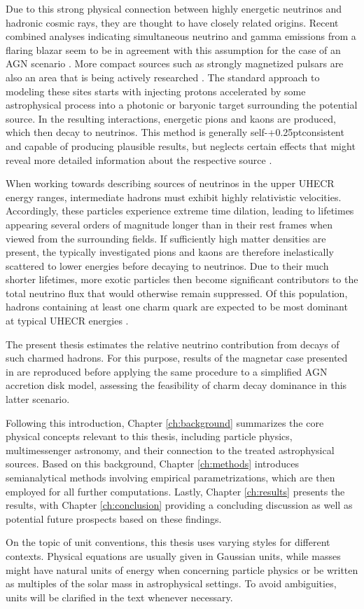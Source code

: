 Due to this strong physical connection between highly energetic neutrinos and hadronic cosmic rays, they are thought to have
closely related origins. Recent combined analyses indicating simultaneous neutrino and gamma emissions from a
flaring blazar seem to be in agreement with this assumption for the case of an AGN scenario \cite{ic_blazar_flare, ic_blazar_signal}.
More compact sources such as strongly magnetized pulsars are also an area that is being actively researched \cite{Murase_2009}.
The standard approach to modeling these sites starts with injecting protons accelerated by some astrophysical process into
a photonic or baryonic target surrounding the potential source. In the resulting interactions, energetic pions and kaons are
produced, which then decay to neutrinos. This method is generally self-{\kern+0.25pt}consistent and capable of producing
plausible results, but neglects certain effects that might reveal more detailed information about the respective source
\cite{Carpio_2020}.

When working towards describing sources of neutrinos in the upper UHECR energy ranges, intermediate hadrons must exhibit
highly relativistic velocities. Accordingly, these particles experience extreme time dilation, leading to lifetimes
appearing several orders of magnitude longer than in their rest frames when viewed from the surrounding fields.
If sufficiently high matter densities are present, the typically investigated pions and kaons are therefore inelastically
scattered to lower energies before decaying to neutrinos. Due to their much shorter lifetimes, more exotic particles then
become significant contributors to the total neutrino flux that would otherwise remain suppressed. Of this population,
hadrons containing at least one charm quark are expected to be most dominant at typical UHECR energies \cite{Tjus_2023}.

The present thesis estimates the relative neutrino contribution from decays of such charmed hadrons. For this purpose, results
of the magnetar case presented in \cite{Carpio_2020} are reproduced before applying the same procedure to a simplified AGN
accretion disk model, assessing the feasibility of charm decay dominance in this latter scenario.

Following this introduction, Chapter \ref{ch:background} summarizes the core physical concepts relevant to this thesis,
including particle physics, multimessenger astronomy, and their connection to the treated astrophysical sources. Based
on this background, Chapter \ref{ch:methods} introduces semianalytical methods involving empirical parametrizations,
which are then employed for all further computations. Lastly, Chapter \ref{ch:results} presents the results, with Chapter
\ref{ch:conclusion} providing a concluding discussion as well as potential future prospects based on these findings.

On the topic of unit conventions, this thesis uses varying styles for different contexts. Physical equations are usually given
in Gaussian units, while masses might have natural units of energy when concerning particle physics or be written as multiples
of the solar mass in astrophysical settings. To avoid ambiguities, units will be clarified in the text whenever necessary.

